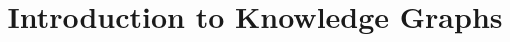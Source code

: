 \documentclass[xcolor=dvipsnames,compress,t,pdf,9pt]{beamer}
\title[\insertframenumber /\inserttotalframenumber]{Introduction to Knowledge Graphs}
\begin{document}
	\begin{frame}
	\titlepage
	\end{frame}
%	
	
	
\end{document}
